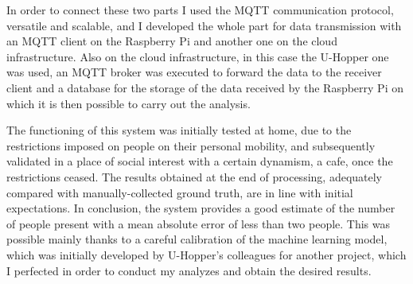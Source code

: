 In order to connect these two parts I used the MQTT communication protocol, versatile and scalable, and I developed the whole part for data transmission with an MQTT client on the Raspberry Pi and another one on the cloud infrastructure. Also on the cloud infrastructure, in this case the U-Hopper one was used, an MQTT broker was executed to forward the data to the receiver client and a database for the storage of the data received by the Raspberry Pi on which it is then possible to carry out the analysis.

The functioning of this system was initially tested at home, due to the restrictions imposed on people on their personal mobility, and subsequently validated in a place of social interest with a certain dynamism, a cafe, once the restrictions ceased. The results obtained at the end of processing, adequately compared with manually-collected ground truth, are in line with initial expectations. In conclusion, the system provides a good estimate of the number of people present with a mean absolute error of less than two people. This was possible mainly thanks to a careful calibration of the machine learning model, which was initially developed by U-Hopper's colleagues for another project, which I perfected in order to conduct my analyzes and obtain the desired results.
